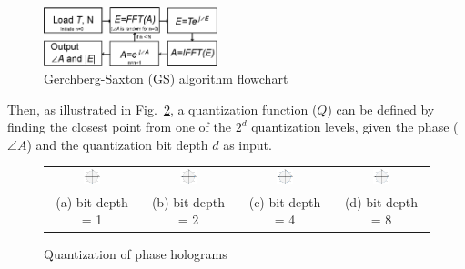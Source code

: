 	\begin{figure} [ht]
	   \begin{center}
	   \includegraphics[width = 0.45\textwidth]{GS_flowchart.eps}
	   \end{center}
	   \caption{\label{fig:GS_flowchart} Gerchberg-Saxton (GS) \cite{Gerchberg1972} algorithm flowchart}
	\end{figure}

	Then, as illustrated in Fig.~\ref{fig:Quantization_bit_depth}, a quantization function ($Q$) can be defined by finding the closest point from one of the $2^d$ quantization levels, given the phase ($\angle A$) and the quantization bit depth $d$ as input.

	\begin{figure} [ht]
		\begin{center}
			\begin{tabular}{c c c c}
				\includegraphics[width = 0.2\textwidth]{Quantization_bit_depth_1.jpg} & \includegraphics[width = 0.2\textwidth]{Quantization_bit_depth_2.jpg} & \includegraphics[width = 0.2\textwidth]{Quantization_bit_depth_4.jpg} & \includegraphics[width = 0.2\textwidth]{Quantization_bit_depth_8.jpg}\\
				(a) bit depth = 1 & (b) bit depth = 2 & (c) bit depth = 4 & (d) bit depth = 8
			\end{tabular}
			\caption{\label{fig:Quantization_bit_depth} Quantization of phase holograms}
		\end{center}
	\end{figure}

